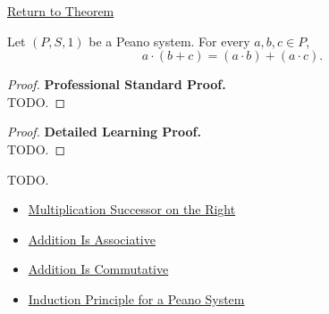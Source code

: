 \newpage
{}
\label{prf:multiplication-distributes-over-addition}

\begin{remark*}[Return]
\hyperref[thm:multiplication-distributes-over-addition]{Return to Theorem}
\end{remark*}

\begin{theorem*}
Let $(P,S,1)$ be a Peano system. For every $a,b,c \in P$,
\[
a \cdot (b+c) = (a \cdot b) + (a \cdot c).
\]
\end{theorem*}

\begin{proof}
\textbf{Professional Standard Proof.}~\\
TODO.
\end{proof}

\begin{proof}
\textbf{Detailed Learning Proof.}~\\
TODO.
\end{proof}

\begin{remark*}
TODO.
\end{remark*}

\begin{dependencies}
\begin{itemize}
  \item \hyperref[thm:multiplication-successor-on-right]{Multiplication Successor on the Right}
  \item \hyperref[thm:addition-associative]{Addition Is Associative}
  \item \hyperref[thm:addition-commutative]{Addition Is Commutative}
  \item \hyperref[thm:induction-principle-for-peano-system]{Induction Principle for a Peano System}
\end{itemize}
\end{dependencies}
